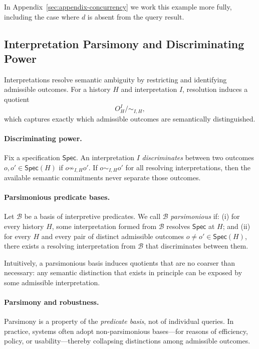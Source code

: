\documentclass[acmsmall,nonacm]{acmart}
\theoremstyle{remark}
\numberwithin{definition}{section}
\numberwithin{theorem}{section}
\numberwithin{lemma}{section}
\numberwithin{corollary}{section}
\numberwithin{remark}{section}
\numberwithin{example}{section}
\numberwithin{observation}{section}
\numberwithin{assumption}{section}
\newcommand{\Spec}{\mathsf{Spec}}
\begin{document}
In Appendix~\ref{sec:appendix-concurrency} we work this example more fully, including 
the case where $d$ is absent from the query result.

\subsection{Interpretation Parsimony and Discriminating Power}
\label{sec:parsimony}

Interpretations resolve semantic ambiguity by restricting and identifying
admissible outcomes.
For a history $H$ and interpretation $I$, resolution induces a quotient
\[
  O_H^I \big/ {\sim_{I,H}},
\]
which captures exactly which admissible outcomes are semantically distinguished.

\paragraph{Discriminating power.}
Fix a specification $\Spec$.
An interpretation $I$ \emph{discriminates} between two outcomes
$o,o' \in \Spec(H)$ if $o \not\sim_{I,H} o'$.
If $o \sim_{I,H} o'$ for all resolving interpretations, then the available
semantic commitments never separate those outcomes.

\paragraph{Parsimonious predicate bases.}
Let $\mathcal{B}$ be a basis of interpretive predicates.
We call $\mathcal{B}$ \emph{parsimonious} if:
(i) for every history $H$, some interpretation formed from $\mathcal{B}$
resolves $\Spec$ at $H$; and
(ii) for every $H$ and every pair of distinct admissible outcomes
$o \neq o' \in \Spec(H)$, there exists a resolving interpretation from
$\mathcal{B}$ that discriminates between them.

Intuitively, a parsimonious basis induces quotients that are no coarser than
necessary: any semantic distinction that exists in principle can be exposed by
some admissible interpretation.

\paragraph{Parsimony and robustness.}
Parsimony is a property of the \emph{predicate basis}, not of individual queries.
In practice, systems often adopt non-parsimonious bases—for reasons of efficiency,
policy, or usability—thereby collapsing distinctions among admissible outcomes.
\end{document}
